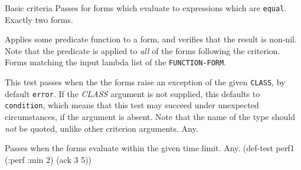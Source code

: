 \begin{criteriaGroup}{Basic criteria}{}
{Passes for forms which evaluate to expressions which are
\texttt{equal}.}
{Exactly two forms.}
{\noExpl}
{\noEx}{}

{Applies some predicate function to a form, and verifies that the
result is non-nil.  Note that the predicate is applied to \emph{all}
of the forms following the criterion.}
{Forms matching the input lambda list of the \texttt{FUNCTION-FORM}.}
{\noExpl}
{\multiEx}
{
 }

{This test passes when the the forms raise an exception of the given
\texttt{CLASS}, by default \texttt{error}.  If the \textit{CLASS} argument is
not supplied, this defaults to \texttt{condition}, which means that this test
may succeed under unexpected circumstances, if the argument is absent.  Note
that the name of the type should \emph{not} be quoted, unlike other criterion arguments.}
{Any.}
{\noExpl}
{\multiEx}
{
 }

{Passes when the forms evaluate within the given time limit.}
{Any.}
{\noExpl}
{\singleEx}{(def-test perf1 (:perf :min 2) (ack 3 5))}

\end{criteriaGroup}

